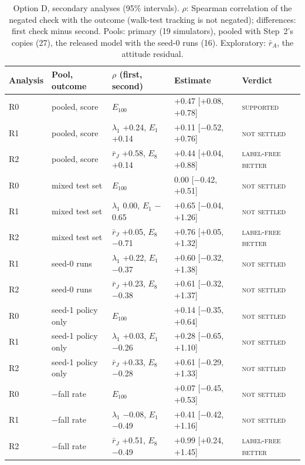 \begin{table}[h]
\centering
\caption{Option D, secondary analyses (95\% intervals). $\rho$: Spearman correlation of the negated check with the
outcome (walk-test tracking is not negated); differences: first check minus second. Pools: primary
(19 simulators), pooled with Step~2's copies (27), the released model with the seed-0 runs
(16). Exploratory: $\bar r_A$, the attitude residual.}
\label{tab:app-dsec}
\footnotesize
\begin{tabular}{@{}lllll@{}}
\toprule
Analysis & Pool, outcome & $\rho$ (first, second) & Estimate & Verdict \\
\midrule
R0 & pooled, score & $E_{100}$ & +0.47 [+0.08, +0.78] & \textsc{supported} \\
R1 & pooled, score & $\lambda_1$ +0.24, $E_1$ +0.14 & +0.11 [$-$0.52, +0.76] & \textsc{not settled} \\
R2 & pooled, score & $\bar r_J$ +0.58, $E_8$ +0.14 & +0.44 [+0.04, +0.88] & \textsc{label-free better} \\
R0 & mixed test set & $E_{100}$ & 0.00 [$-$0.42, +0.51] & \textsc{not settled} \\
R1 & mixed test set & $\lambda_1$ 0.00, $E_1$ $-$0.65 & +0.65 [$-$0.04, +1.26] & \textsc{not settled} \\
R2 & mixed test set & $\bar r_J$ +0.05, $E_8$ $-$0.71 & +0.76 [+0.05, +1.32] & \textsc{label-free better} \\
R1 & seed-0 runs & $\lambda_1$ +0.22, $E_1$ $-$0.37 & +0.60 [$-$0.32, +1.38] & \textsc{not settled} \\
R2 & seed-0 runs & $\bar r_J$ +0.23, $E_8$ $-$0.38 & +0.61 [$-$0.32, +1.37] & \textsc{not settled} \\
R0 & seed-1 policy only & $E_{100}$ & +0.14 [$-$0.35, +0.64] & \textsc{not settled} \\
R1 & seed-1 policy only & $\lambda_1$ +0.03, $E_1$ $-$0.26 & +0.28 [$-$0.65, +1.10] & \textsc{not settled} \\
R2 & seed-1 policy only & $\bar r_J$ +0.33, $E_8$ $-$0.28 & +0.61 [$-$0.29, +1.33] & \textsc{not settled} \\
R0 & $-$fall rate & $E_{100}$ & +0.07 [$-$0.45, +0.53] & \textsc{not settled} \\
R1 & $-$fall rate & $\lambda_1$ $-$0.08, $E_1$ $-$0.49 & +0.41 [$-$0.42, +1.16] & \textsc{not settled} \\
R2 & $-$fall rate & $\bar r_J$ +0.51, $E_8$ $-$0.49 & +0.99 [+0.24, +1.45] & \textsc{label-free better} \\

\end{tabular}
\end{table}
